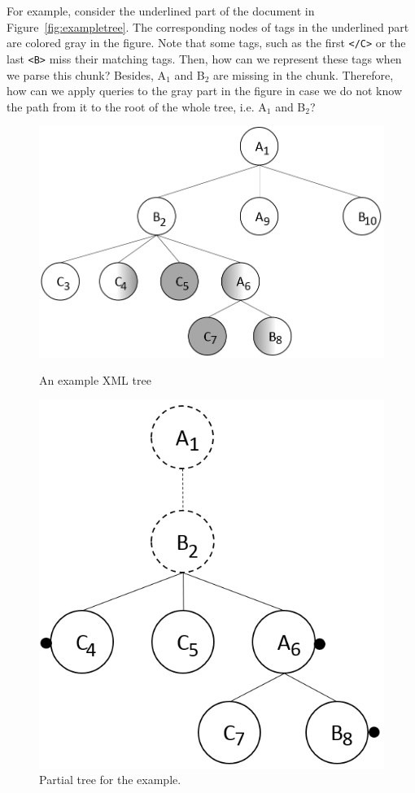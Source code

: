 For example, consider the underlined part of the document in
Figure~\ref{fig:exampletree}. The corresponding nodes of tags in the underlined
part are colored gray in the figure. Note that some tags, such as the first
\verb|</C>| or the last \verb|<B>| miss their matching tags. Then, how can we
represent these tags when we parse this chunk?  Besides, A$_1$ and B$_2$
are missing in the chunk. Therefore, how can we apply  queries to the gray part
in the figure in case we do not know the path  from it to the root of the whole
tree, i.e.  A$_1$ and B$_2$?


\begin{figure}[t]
	\centering\includegraphics[scale=0.3]{introduction/figures/exampletree.png}
	\caption{An example XML tree}
	\label{fig:exampletree}
	\centering\includegraphics[scale=0.3]{introduction/figures/examplepartialtree.png}
	\caption{Partial tree for the example.}
	\label{fig:examplepartialtree}
\end{figure}


